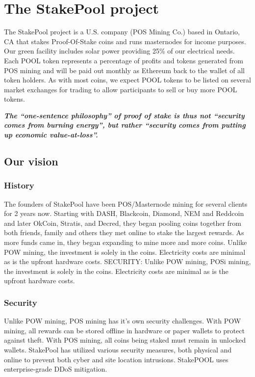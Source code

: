 \section{The StakePool project}

The  StakePool  project  is  a   U.S.  company  (POS  Mining  Co.) based  in  Ontario,  CA  that  stakes  Proof-Of-Stake  coins  and  runs  masternodes  for income  purposes.  Our  green  facility  includes  solar  power  providing  25\%  of  our  electrical needs.  Each  POOL  token  represents  a   percentage  of  profits  and  tokens  generated  from POS  mining  and  will  be  paid  out  monthly  as  Ethereum  back  to  the  wallet  of  all  token holders.  As  with  most  coins,  we  expect  POOL  tokens  to  be  listed  on  several  market exchanges  for  trading  to  allow  participants  to  sell  or  buy  more  POOL  tokens.

\textbf{\emph{The ``one-sentence philosophy'' of proof of stake is thus not ``security comes from burning energy'', but rather ``security comes from putting up economic value-at-loss''.}}  \cite{vbuterinposphi}

 \subsection{Our vision}
  \subsubsection{History}
The founders of StakePool have been POS/Masternode mining for several clients for 2 years now. Starting with DASH, Blackcoin, Diamond, NEM and Reddcoin and later OkCoin, Stratis, and Decred, they began pooling coins together from both friends, family and others they met online to stake the largest rewards. As more funds came in, they began expanding to mine more and more coins. Unlike POW mining, the investment is solely in the coins. Electricity costs are minimal as is the upfront hardware costs. SECURITY: Unlike POW mining, POSi mining, the investment is solely in the coins. Electricity costs are minimal as is the upfront hardware costs.

  \subsubsection{Security}
Unlike POW mining, POS mining has it’s own security challenges. With POW mining, all rewards can be stored offline in hardware or paper wallets to protect against theft. With POS mining, all coins being staked must remain in unlocked wallets. StakePool has utilized various security measures, both physical and online to prevent both cyber and site location intrusions. StakePOOL uses enterprise-grade DDoS mitigation.

